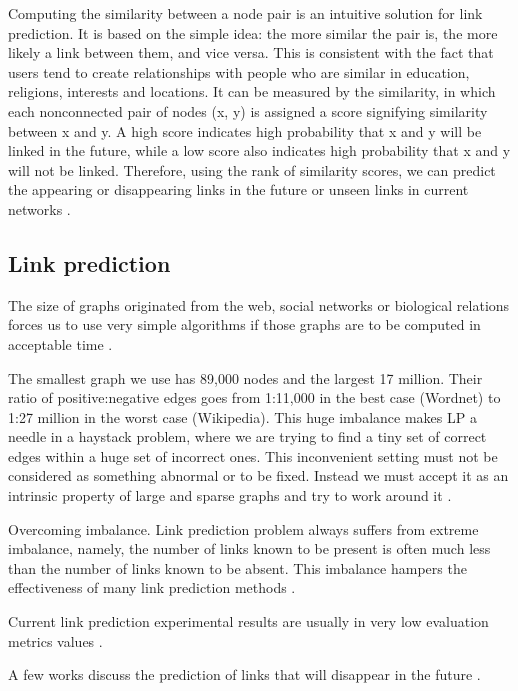 Computing the similarity between a node pair is an intuitive solution for link prediction. It is based on the simple idea: the more similar the pair is, the more likely a link between them, and vice versa. This is consistent with the fact that users tend to create relationships with people who are similar in education, religions, interests and locations. It can be measured by the similarity, in which each nonconnected pair of nodes (x, y) is assigned a score signifying similarity between x and y. A high score indicates high probability that x and y will be linked in the future, while a low score also indicates high probability that x and y will not be linked. Therefore, using the rank of similarity scores, we can predict the appearing or disappearing links in the future or unseen links in current networks \cite{wang2014link}.






\subsection{Link prediction}

The size of graphs originated from the web, social networks or biological relations forces us to use very simple algorithms if those graphs are to be computed in acceptable time \cite{garcia2014link}.

The smallest graph we use has 89,000 nodes and the largest 17 million. Their ratio of positive:negative edges goes from 1:11,000 in the best case (Wordnet) to 1:27 million in the worst case (Wikipedia). This huge imbalance makes LP a needle in a haystack problem, where we are trying to find a tiny set of correct edges within a huge set of incorrect ones. This inconvenient setting must not be considered as something abnormal or to be fixed. Instead we must accept it as an intrinsic property of large and sparse graphs and try to work around it \cite{garcia2014link}.

Overcoming imbalance. Link prediction problem always suffers from extreme imbalance, namely, the number of links known to be present is often much less than the number of links known to be absent. This imbalance hampers the effectiveness of many link prediction methods \cite{wang2014link}.

Current link prediction experimental results are usually in very low evaluation metrics values \cite{wang2014link}.

A few works discuss the prediction of links that will disappear in the future \cite{almansoori2012link}.

